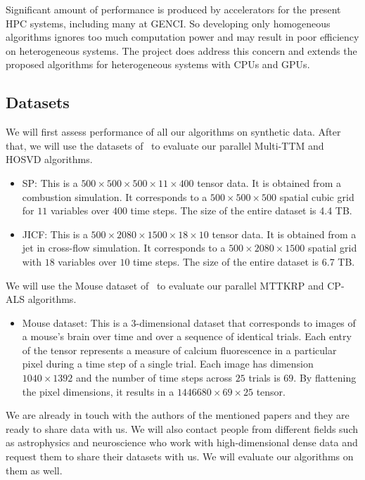 \documentclass[a4paper,11pt]{article}
\begin{document}
	
	
	Significant amount of performance is produced by accelerators for the present HPC systems, including many at GENCI. So developing only homogeneous algorithms ignores too much computation power and may result in poor efficiency on heterogeneous systems. The project does address this concern and extends the proposed algorithms for heterogeneous systems with CPUs and GPUs.
	
	

	

	\subsection{Datasets}
	\label{sec:context:datasets}
	We will first assess performance of all our algorithms on synthetic data. After that, we will use the datasets of~\cite{BKK-TOMS-2020} to evaluate our parallel Multi-TTM and HOSVD algorithms.
	\begin{itemize}
		\item SP: This is a $500 \times 500 \times 500 \times 11 \times 400$ tensor data. It is obtained from a combustion simulation. It corresponds to a $500 \times 500 \times 500$ spatial cubic grid for $11$ variables over $400$ time steps. The size of the entire dataset is 4.4 TB. 
		\item JICF: This is a $500 \times 2080 \times 1500 \times 18 \times 10$ tensor data. It is obtained from a jet in cross-flow simulation. It corresponds to a $500 \times 2080 \times 1500$ spatial grid with $18$ variables over $10$ time steps. The size of the entire dataset is 6.7 TB.
	\end{itemize}
	
	\noindent We will use the Mouse dataset of~\cite{EHBKMP-TOMS-2021} to evaluate our parallel MTTKRP and CP-ALS algorithms.
	\begin{itemize}
		\item Mouse dataset: This is a 3-dimensional dataset that corresponds to images of a mouse's brain over time and over a sequence of identical trials. Each entry of the tensor represents a measure of calcium fluorescence in a particular pixel during a time step of a single trial. Each image has dimension $1040\times 1392$ and the number of time steps across $25$ trials is $69$. By flattening the pixel dimensions, it results in a $1446680 \times 69 \times 25$ tensor. 
	\end{itemize}
	We are already in touch with the authors of the mentioned papers and they are ready to share data with us.
	We will also contact people from different fields such as astrophysics and neuroscience who work with high-dimensional dense data and request them to share their datasets with us. We will evaluate our algorithms on them as well.
	
\end{document}
